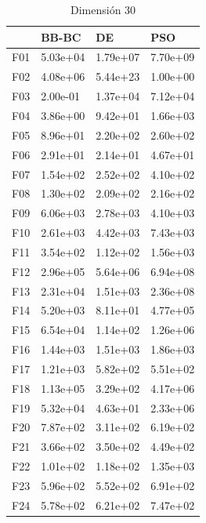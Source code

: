 \begin{table}[H]
\begin{minipage}{.5\linewidth}
    \end{minipage}%
    \begin{minipage}{.5\linewidth}
      \centering
        \caption{Dimensión 30}
        \begin{tabular}{llll}
            \toprule
            {} &     BB-BC &        DE &       PSO \\
            \midrule
            F01  &  5.03e+04 &  1.79e+07 &  7.70e+09 \\
            F02  &  4.08e+06 &  5.44e+23 &  1.00e+00 \\
            F03  &  2.00e-01 &  1.37e+04 &  7.12e+04 \\
            F04  &  3.86e+00 &  9.42e+01 &  1.66e+03 \\
            F05  &  8.96e+01 &  2.20e+02 &  2.60e+02 \\
            F06  &  2.91e+01 &  2.14e+01 &  4.67e+01 \\
            F07  &  1.54e+02 &  2.52e+02 &  4.10e+02 \\
            F08  &  1.30e+02 &  2.09e+02 &  2.16e+02 \\
            F09  &  6.06e+03 &  2.78e+03 &  4.10e+03 \\
            F10  &  2.61e+03 &  4.42e+03 &  7.43e+03 \\
            F11  &  3.54e+02 &  1.12e+02 &  1.56e+03 \\
            F12  &  2.96e+05 &  5.64e+06 &  6.94e+08 \\
            F13  &  2.31e+04 &  1.51e+03 &  2.36e+08 \\
            F14  &  5.20e+03 &  8.11e+01 &  4.77e+05 \\
            F15  &  6.54e+04 &  1.14e+02 &  1.26e+06 \\
            F16  &  1.44e+03 &  1.51e+03 &  1.86e+03 \\
            F17  &  1.21e+03 &  5.82e+02 &  5.51e+02 \\
            F18  &  1.13e+05 &  3.29e+02 &  4.17e+06 \\
            F19  &  5.32e+04 &  4.63e+01 &  2.33e+06 \\
            F20  &  7.87e+02 &  3.11e+02 &  6.19e+02 \\
            F21  &  3.66e+02 &  3.50e+02 &  4.49e+02 \\
            F22  &  1.01e+02 &  1.18e+02 &  1.35e+03 \\
            F23  &  5.96e+02 &  5.52e+02 &  6.91e+02 \\
            F24  &  5.78e+02 &  6.21e+02 &  7.47e+02 \\

\end{tabular}
\end{minipage}
\end{table}
